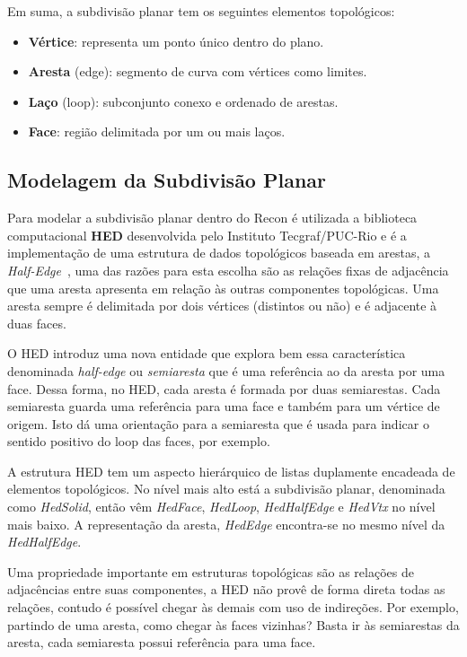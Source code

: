 Em suma, a subdivisão planar tem os seguintes elementos topológicos:
\renewcommand{\labelitemi}{•}
\begin{itemize}
  \item \textbf{Vértice}: representa um ponto único dentro do plano.
  \item \textbf{Aresta} (edge): segmento de curva com vértices como limites.
  \item \textbf{Laço} (loop): subconjunto conexo e ordenado de arestas.
  \item \textbf{Face}: região delimitada por um ou mais laços.
\end{itemize}

\subsection{Modelagem da Subdivisão Planar}

Para modelar a subdivisão planar dentro do Recon é utilizada a biblioteca computacional \textbf{HED} desenvolvida pelo Instituto Tecgraf/PUC-Rio e é a implementação de uma estrutura de dados topológicos baseada em arestas, a \textit{Half-Edge}~\cite{HED}, uma das razões para esta escolha são as relações fixas de adjacência que uma aresta apresenta em relação às outras componentes topológicas. Uma aresta sempre é delimitada por dois vértices (distintos ou não) e é adjacente à duas faces.

O HED introduz uma nova entidade que explora bem essa característica denominada \textit{half-edge} ou \textit{semiaresta} que é uma referência ao  da aresta por uma face. Dessa forma, no HED, cada aresta é formada por duas semiarestas. Cada semiaresta guarda uma referência para uma face e também para um vértice de origem. Isto dá uma orientação para a semiaresta que é usada para indicar o sentido positivo do loop das faces, por exemplo.

A estrutura HED tem um aspecto hierárquico de listas duplamente encadeada de elementos topológicos. No nível mais alto está a subdivisão planar, denominada como \textit{HedSolid}, então vêm \textit{HedFace}, \textit{HedLoop}, \textit{HedHalfEdge} e \textit{HedVtx} no nível mais baixo. A representação da aresta, \textit{HedEdge} encontra-se no mesmo nível da \emph{HedHalfEdge}.

Uma propriedade importante em estruturas topológicas são as relações de adjacências entre suas componentes, a HED não provê de forma direta todas as relações, contudo é possível chegar às demais com uso de indireções. Por exemplo, partindo de uma aresta, como chegar às faces vizinhas? Basta ir às semiarestas da aresta, cada semiaresta possui referência para uma face.

